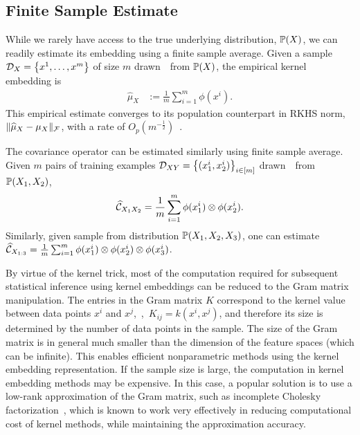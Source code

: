 \documentclass{article}
\newcommand{\hmu}{\widehat{\mu}}
\begin{document}
\subsection{Finite Sample Estimate}

While we rarely have access to the true underlying distribution, $\mathbb{P}(X)$,
we can readily estimate its embedding using a finite sample average. Given a sample $\mathcal{D}_{X} = \left\{x^1, \ldots, x^m\right\}$ of size $m$ drawn~\iid~from $\mathbb{P}(X)$, the empirical kernel embedding is
\begin{align}
    \hmu_{X} &:= \frac{1}{m} \sum\nolimits_{i=1}^m \phi(x^i). \label{eq:empirical_embedding}
\end{align}
This empirical estimate converges to its population counterpart in RKHS norm, $\|\hmu_X - \mu_X \|_{\Fcal}$, with a rate of $O_p(m^{-\frac{1}{2}})$~\cite{SmoGreSonSch07}.

The covariance operator can be estimated similarly using finite sample average.
Given $m$ pairs of training examples $\mathcal{D}_{XY}=\left\{(x_1^i,x_2^i)\right\}_{i\in [m]}$ drawn~\iid~from $\mathbb{P}(X_1,X_2)$,
\begin{align}
 \widehat {\mathcal{C}}_{X_1X_2} =\frac{1}{m}\sum_{i=1}^m \phi(x_1^i) \otimes \phi(x_2^i). \label{eq:empirical_covariance}
\end{align}
Similarly, given sample from distribution $\mathbb{P}(X_1,X_2,X_3)$, one can estimate $\widehat {\mathcal{C}}_{X_{1:3}} = \frac{1}{m} \sum_{i = 1}^m \phi(x_1^i) \otimes \phi(x_2^i) \otimes \phi(x_3^i)$.

By virtue of the kernel trick, most of the computation required for subsequent statistical inference using kernel embeddings can be reduced to the Gram matrix manipulation. The entries in the Gram matrix $K$ correspond to the kernel value between data points $x^i$ and $x^j$,~\ie,~$K_{ij} = k(x^i,x^j)$, and therefore its size is determined by the number of data points in the sample. The size of the Gram matrix is in general much smaller than the dimension of the feature spaces (which can be infinite). This enables efficient nonparametric methods using the kernel embedding representation. If the sample size is large, the computation in kernel embedding methods may be expensive. In this case, a popular solution is to use a low-rank approximation of the Gram matrix, such as incomplete Cholesky factorization~\cite{FinSch01}, which is known to work very effectively in reducing computational cost of kernel methods, while maintaining the approximation accuracy.
\end{document}
